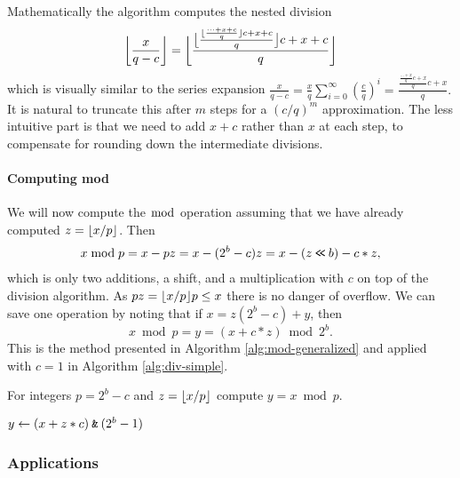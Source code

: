 Mathematically the algorithm computes the nested division
$$
\bbfloor{\frac{x}{q-c}}
=
\bbfloor{\frac{
   \bfloor{\frac{
      \floor{\frac{
         \dots+x+c
      }{q}}c +x+c
   }{q}}c +x+c
}{q}}
\vspace{-1em} %
$$
which is visually similar to the series expansion
$
   \frac{x}{q-c}
   = \frac{x}{q}\sum_{i=0}^\infty (\frac{c}{q})^i
   = \frac{\frac{\frac{\dots+x}{q}c+x}{q}c+x}{q}.
$
It is natural to truncate this after $m$ steps for a $(c/q)^m$ approximation.
The less intuitive part is that we need to add $x+c$ rather than $x$ at each step, to compensate for rounding down the intermediate divisions.

\paragraph{Computing mod}
We will now compute the $\bmod$ operation assuming that
we have already computed $z=\lfloor {x/p} \rfloor$. Then
\begin{align}
   x \bmod p
   = x - pz
   = x - (2^b-c)z
   = x - (z\mathbin{\texttt{<\!<}} b) - c*z,
\end{align}
which is only two additions, a shift, and a multiplication with $c$ on top of the division algorithm.
As $pz = \lfloor {x/p} \rfloor p \le x$ there is no danger of overflow.
We can save one operation by noting
that if $x = z (2^b-c) + y$, then
$$x\bmod p = y=\left(x+c*z \right) \bmod 2^b.$$
This is the method presented in Algorithm \ref{alg:mod-generalized} and applied with $c=1$ in Algorithm \ref{alg:div-simple}.
\begin{algorithm}[H]
   \caption{For integers $p=2^b-c$ and $z=\lfloor {x/p} \rfloor$ compute
      $y=x \bmod p$.}
   \label{alg:mod-generalized}
   \begin{algorithmic}
      \State $y \gets (x + z*c) \mathbin{\texttt{\&}} (2^b-1)$
   \end{algorithmic}
\end{algorithm}




\subsubsection{Applications}\label{sec:general-applications}

